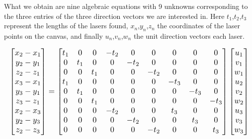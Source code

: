 \documentclass[a4paper]{article}
\begin{document}
What we obtain are nine algebraic equations with 9 unknowns corresponding to the three entries of the three direction vectors we are interested in. Here $t_1$,$t_2$,$t_3$ represent the lengths of the lasers found, $x_n$,$y_n$,$z_n$ the coordinates of the laser points on the canvas, and finally $u_n$,$v_n$,$w_n$ the unit direction vectors each laser. 

\begin{equation}
\resizebox{\linewidth}{!}{$
\begin{bmatrix}
x_2 - x_1 \\
y_2 - y_1 \\
z_2 - z_1 \\
x_3 - x_1 \\
y_3 - y_1 \\
z_3 - z_1 \\
x_2 - x_3 \\
y_2 - y_3 \\
z_2 - z_3 
\end{bmatrix} = 
\begin{bmatrix}
t_1 & 0   & 0   &-t_2 & 0   & 0   & 0   & 0   & 0   \\
0   & t_1 & 0   & 0   &-t_2 & 0   & 0   & 0   & 0   \\
0   & 0   & t_1 & 0   & 0   &-t_2 & 0   & 0   & 0   \\
t_1 & 0   & 0   & 0   & 0   & 0   &-t_3 & 0   & 0   \\
0   & t_1 & 0   & 0   & 0   & 0   & 0   &-t_3 & 0   \\
0   & 0   & t_1 & 0   & 0   & 0   & 0   & 0   &-t_3 \\
0   & 0   & 0   &-t_2 & 0   & 0   & t_3 & 0   & 0   \\
0   & 0   & 0   & 0   &-t_2 & 0   & 0   & t_3 & 0   \\
0   & 0   & 0   & 0   & 0   &-t_2 & 0   & 0   & t_3 
\end{bmatrix}
\begin{bmatrix}
u_1\\
v_1\\
w_1\\
u_2\\
v_2\\
w_2\\
u_3\\
v_3\\
w_3
\end{bmatrix} $}
\end{equation}
\end{document}
